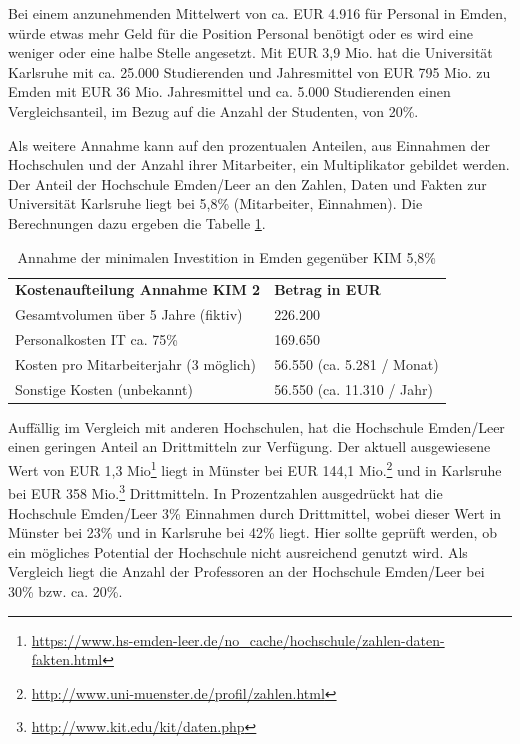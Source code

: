 Bei einem anzunehmenden Mittelwert von ca. EUR 4.916 für Personal in Emden, würde etwas mehr Geld für die Position Personal benötigt oder es wird eine weniger oder eine halbe Stelle angesetzt. Mit EUR 3,9 Mio. hat die Universität Karlsruhe mit ca. 25.000 Studierenden und Jahresmittel von EUR 795 Mio.  zu Emden mit EUR 36 Mio. Jahresmittel und ca. 5.000 Studierenden einen Vergleichsanteil, im Bezug auf die Anzahl der Studenten, von 20\%.


Als weitere Annahme kann auf den prozentualen Anteilen, aus Einnahmen der Hochschulen und der Anzahl ihrer Mitarbeiter,
ein Multiplikator gebildet werden. Der Anteil der Hochschule Emden/Leer an den Zahlen, Daten und Fakten zur Universität Karlsruhe liegt bei 5,8\% (Mitarbeiter, Einnahmen). Die Berechnungen dazu ergeben die Tabelle \ref{tab_kostenaufteilung_emden_KIM2}.

\begin{table}[h!]
	\begin{tabularx}{\textwidth}{l|l}
		\hline
		\textbf{Kostenaufteilung Annahme KIM 2} & \textbf{Betrag in EUR}\\
		Gesamtvolumen über 5 Jahre (fiktiv) & 226.200\\
		Personalkosten IT ca. 75\% & 169.650\\
		Kosten pro Mitarbeiterjahr (3 möglich) & 56.550 (ca. 5.281 / Monat)\\ 
		Sonstige Kosten (unbekannt) & 56.550 (ca. 11.310 / Jahr)\\
		\hline
	\end{tabularx}
	\caption{Annahme der minimalen Investition in Emden gegenüber KIM 5,8\%}
	\label{tab_kostenaufteilung_emden_KIM2}
\end{table}

Auffällig im Vergleich mit anderen Hochschulen, hat die Hochschule Emden/Leer einen geringen Anteil an Drittmitteln zur Verfügung. Der aktuell ausgewiesene Wert von EUR 1,3 Mio\footnote{\url{https://www.hs-emden-leer.de/no_cache/hochschule/zahlen-daten-fakten.html}} liegt in Münster bei EUR 144,1 Mio.\footnote{\url{http://www.uni-muenster.de/profil/zahlen.html}} und in Karlsruhe bei EUR 358 Mio.\footnote{\url{http://www.kit.edu/kit/daten.php}} Drittmitteln. In Prozentzahlen ausgedrückt hat die Hochschule Emden/Leer 3\% Einnahmen durch Drittmittel, wobei dieser Wert in Münster bei 23\% und in Karlsruhe bei 42\% liegt. Hier sollte geprüft werden, ob ein mögliches Potential der Hochschule nicht ausreichend genutzt wird. Als Vergleich liegt die Anzahl der Professoren an der Hochschule Emden/Leer bei 30\% bzw. ca. 20\%.

